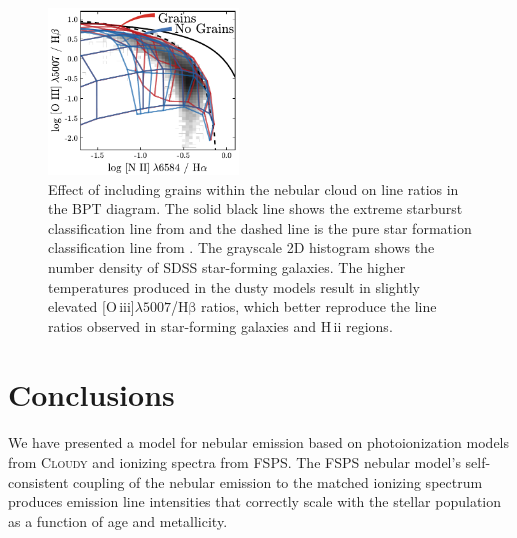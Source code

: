 \documentclass[linenumbers, trackchanges, tighten]{aastex61}%
\newcommand{\FSPS}{{\sc FSPS}\xspace}
\newcommand{\Cloudy}{\textsc{Cloudy}\xspace}
\newcommand{\oiii}{[O\,{\sc iii}]\xspace}
\newcommand{\hb}{\ensuremath{\mathrm{H\beta}}}
\newcommand{\hii}{H\,{\sc ii}\xspace}
\newcommand\lam[1]{\ensuremath{\lambda #1}}
\newcommand\oiiihb{\oiii{}\lam{5007}/\hb{}}
\begin{document}
\begin{figure}[!htbp]
  \begin{centering}
    \includegraphics[width=0.45\textwidth]{f31.pdf}
    \caption{Effect of including grains within the nebular cloud on line ratios in the BPT diagram. The solid black line shows the extreme starburst classification line from \citet{Kewley01} and the dashed line is the pure star formation classification line from \citet{Kauffmann03a}. The grayscale 2D histogram shows the number density of SDSS star-forming galaxies. The higher temperatures produced in the dusty models result in slightly elevated \oiiihb{} ratios, which better reproduce the line ratios observed in star-forming galaxies and \hii regions.}
    \label{fig:dustBPT}
  \end{centering}
\end{figure}

\section{Conclusions}\label{sec:conclusions}

We have presented a model for nebular emission based on photoionization models from \Cloudy and ionizing spectra from \FSPS. The \FSPS nebular model's self-consistent coupling of the nebular emission to the matched ionizing spectrum produces emission line intensities that correctly scale with the stellar population as a function of age and metallicity.
\end{document}
